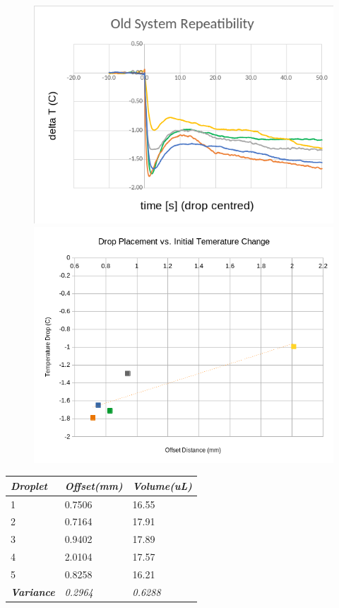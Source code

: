\begin{figure}[h]
    \begin{center}
        \includegraphics[width=.4\textwidth]{img/drop_temps_2018.png}
        \includegraphics[width=.4\textwidth]{img/2018_pos_temp_trend.png}
    \end{center}
\end{figure}

\begin{table}[h]
    \centering
    \begin{tabular}{|l|l|l|}
    \hline
    \textit{\textbf{Droplet}} & \textit{Offset(mm)} & \textit{Volume(uL)}  \\ \hline
    \cellcolor[HTML]{9698ED}1 & 0.7506              & 16.55 \\ \hline
    \cellcolor[HTML]{E9AD3F}2 & 0.7164              & 17.91 \\ \hline
    \cellcolor[HTML]{C0C0C0}3 & 0.9402              & 17.89 \\ \hline
    \cellcolor[HTML]{FFFC9E}4 & 2.0104              & 17.57 \\ \hline
    \cellcolor[HTML]{79CD5D}5 & 0.8258              & 16.21 \\ \hline
    \cellcolor[HTML]{FFFFFF}\textbf{\textit{Variance}} &\textit{0.2964}        & \textit{0.6288}  \\ \hline
    \end{tabular}
    \end{table}

